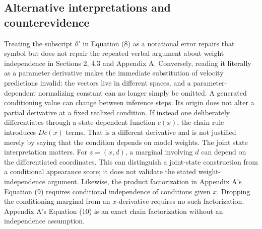 \documentclass[10pt]{article}
\begin{document}
\subsection*{Alternative interpretations and counterevidence}
Treating the subscript \(\theta'\) in Equation (8) as a notational error repairs that symbol but does not repair the repeated verbal argument about weight independence in Sections 2, 4.3 and Appendix A. Conversely, reading it literally as a parameter derivative makes the immediate substitution of velocity predictions invalid: the vectors live in different spaces, and a parameter-dependent normalizing constant can no longer simply be omitted. A generated conditioning value can change between inference steps. Its origin does not alter a partial derivative at a fixed realized condition. If instead one deliberately differentiates through a state-dependent function \(c(x)\), the chain rule introduces \(D c(x)\) terms. That is a different derivative and is not justified merely by saying that the condition depends on model weights. The joint state interpretation matters. For \(z=(x,d)\), a marginal involving \(d\) can depend on the differentiated coordinates. This can distinguish a joint-state construction from a conditional appearance score; it does not validate the stated weight-independence argument. Likewise, the product factorization in Appendix A’s Equation (9) requires conditional independence of conditions given \(x\). Dropping the conditioning marginal from an \(x\)-derivative requires no such factorization. Appendix A’s Equation (10) is an exact chain factorization without an independence assumption.\par
\end{document}
